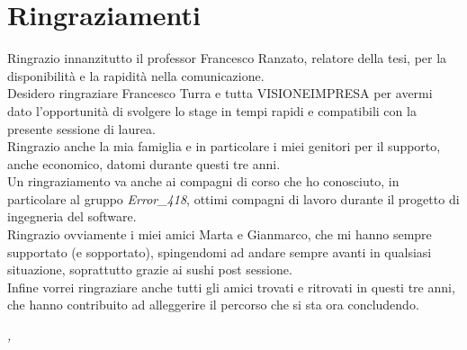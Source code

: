 \cleardoublepage
{}
{}

\bigskip

\begingroup
\let\clearpage\relax
\let\cleardoublepage\relax
\let\cleardoublepage\relax

\chapter*{Ringraziamenti}

Ringrazio innanzitutto il professor Francesco Ranzato, relatore della tesi, per la disponibilità e la rapidità nella comunicazione.\\

\noindent Desidero ringraziare Francesco Turra e tutta VISIONEIMPRESA per avermi dato l'opportunità di svolgere lo stage in tempi rapidi e compatibili con la presente sessione di laurea.\\

\noindent Ringrazio anche la mia famiglia e in particolare i miei genitori per il supporto, anche economico, datomi durante questi tre anni.\\

\noindent Un ringraziamento va anche ai compagni di corso che ho conosciuto, in particolare al gruppo \textit{Error\_418}, ottimi compagni di lavoro durante il progetto di ingegneria del software.\\

\noindent Ringrazio ovviamente i miei amici Marta e Gianmarco, che mi hanno sempre supportato (e sopportato), spingendomi ad andare sempre avanti in qualsiasi situazione, soprattutto grazie ai sushi post sessione.\\

\noindent Infine vorrei ringraziare anche tutti gli amici trovati e ritrovati in questi tre anni, che hanno contribuito ad alleggerire il percorso che si sta ora concludendo.\\

\bigskip

\noindent\textit{\myLocation, \myTime}
\hfill \myName

\endgroup
